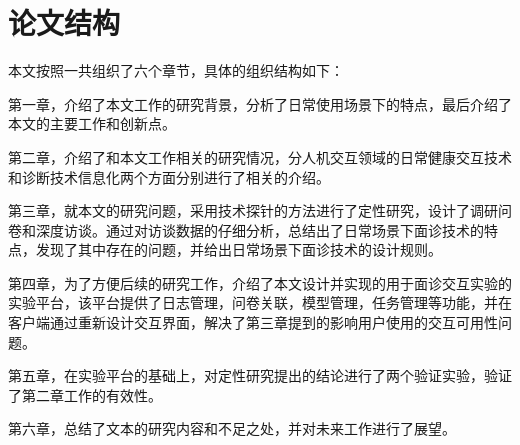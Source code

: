 











\section{论文结构}
本文按照一共组织了六个章节，具体的组织结构如下：

第一章，介绍了本文工作的研究背景，分析了日常使用场景下的特点，最后介绍了本文的主要工作和创新点。

第二章，介绍了和本文工作相关的研究情况，分人机交互领域的日常健康交互技术和诊断技术信息化两个方面分别进行了相关的介绍。

第三章，就本文的研究问题，采用技术探针的方法进行了定性研究，设计了调研问卷和深度访谈。通过对访谈数据的仔细分析，总结出了日常场景下面诊技术的特点，发现了其中存在的问题，并给出日常场景下面诊技术的设计规则。

第四章，为了方便后续的研究工作，介绍了本文设计并实现的用于面诊交互实验的实验平台，该平台提供了日志管理，问卷关联，模型管理，任务管理等功能，并在客户端通过重新设计交互界面，解决了第三章提到的影响用户使用的交互可用性问题。

第五章，在实验平台的基础上，对定性研究提出的结论进行了两个验证实验，验证了第二章工作的有效性。

第六章，总结了文本的研究内容和不足之处，并对未来工作进行了展望。